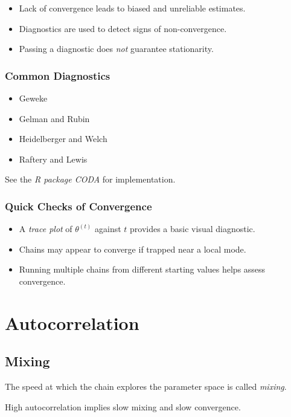 \documentclass[12pt,oneside]{book}
\numberwithin{equation}{section}
\theoremstyle{definition}
\theoremstyle{plain}
\theoremstyle{remark}
\begin{document}
\begin{itemize}
\item Lack of convergence leads to biased and unreliable estimates.
\item Diagnostics are used to detect signs of non-convergence.
\item Passing a diagnostic does \emph{not} guarantee stationarity.
\end{itemize}

\subsubsection*{Common Diagnostics}

\begin{itemize}
\item Geweke
\item Gelman and Rubin
\item Heidelberger and Welch
\item Raftery and Lewis
\end{itemize}

See the \emph{R package CODA} for implementation.

\subsubsection*{Quick Checks of Convergence}

\begin{itemize}
\item A \emph{trace plot} of $\theta^{(t)}$ against $t$ provides a basic visual diagnostic.
\item Chains may appear to converge if trapped near a local mode.
\item Running multiple chains from different starting values helps assess convergence.
\end{itemize}

\section{Autocorrelation}

\subsection*{Mixing}

The speed at which the chain explores the parameter space is called \emph{mixing}.

High autocorrelation implies slow mixing and slow convergence.
\end{document}

